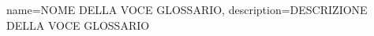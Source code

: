 {
        name=NOME DELLA VOCE GLOSSARIO,
        description={DESCRIZIONE DELLA VOCE GLOSSARIO}
}

